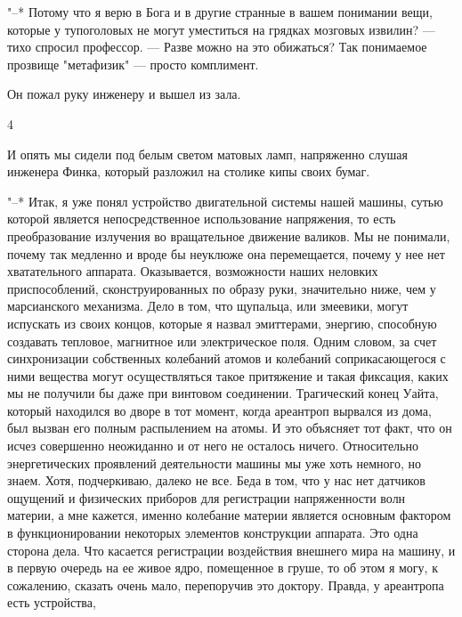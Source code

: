 "--* Потому что я верю в Бога и в другие странные в вашем понимании  вещи,
которые у тупоголовых не могут уместиться на грядках мозговых  извилин?  ---
тихо спросил профессор. --- Разве можно на  это  обижаться?  Так  понимаемое
прозвище "метафизик" --- просто комплимент.

Он пожал руку инженеру и вышел из зала.

\bigskip{}



\bigskip{}

4

\bigskip{}


И опять мы сидели под белым  светом  матовых  ламп,  напряженно  слушая
инженера Финка, который разложил на столике кипы своих бумаг.

"--* Итак, я уже понял устройство двигательной системы нашей машины, сутью
которой  является  непосредственное  использование  напряжения,  то   есть
преобразование излучения во вращательное движение валиков. Мы не понимали,
почему так медленно и вроде бы неуклюже она перемещается, почему у нее нет
хватательного   аппарата.   Оказывается,   возможности   наших    неловких
приспособлений, сконструированных по образу руки, значительно ниже, чем  у
марсианского механизма. Дело в том,  что  щупальца,  или  змеевики,  могут
испускать из своих концов, которые я назвал эмиттерами, энергию, способную
создавать тепловое, магнитное или электрическое  поля.  Одним  словом,  за
счет   синхронизации   собственных   колебаний    атомов    и    колебаний
соприкасающегося с ними вещества могут осуществляться такое  притяжение  и
такая фиксация, каких мы не получили  бы  даже  при  винтовом  соединении.
Трагический конец Уайта, который находился во дворе в  тот  момент,  когда
ареантроп вырвался из дома, был вызван его полным распылением на атомы.  И
это объясняет тот факт, что он исчез совершенно неожиданно и  от  него  не
осталось  ничего.  Относительно  энергетических  проявлений   деятельности
машины мы уже хоть немного, но знаем. Хотя, подчеркиваю,  далеко  не  все.
Беда в том, что у нас нет датчиков  ощущений  и  физических  приборов  для
регистрации напряженности волн материи, а мне  кажется,  именно  колебание
материи является основным фактором в функционировании некоторых  элементов
конструкции аппарата. Это одна  сторона  дела.  Что  касается  регистрации
воздействия внешнего мира на машину, и в первую очередь на ее живое  ядро,
помещенное в груше, то об этом я могу, к сожалению,  сказать  очень  мало,
перепоручив  это  доктору.   Правда,   у   ареантропа   есть   устройства,
